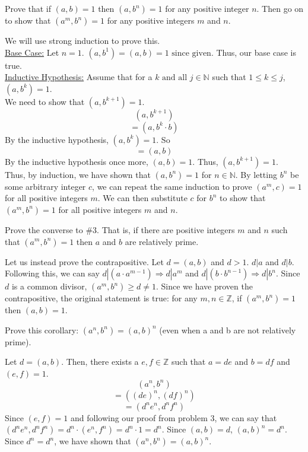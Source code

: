 \documentclass{article}
\begin{document}
\begin{problem}{}{}
    Prove that if $(a, b) = 1$ then $(a, b^n) = 1$ for any positive integer $n$. Then go on to show that $(a^m, b^n) = 1$ for any positive integers $m$ and $n$.
\end{problem}
\begin{solution}{}{}
    We will use strong induction to prove this.\\
    \underline{Base Case:} Let $n=1$. $(a,b^1)=(a,b)=1 \text{ since given.}$ Thus, our base case is true.\\
    \underline{Inductive Hypothesis:} Assume that for a $k \text{ and all } j\in\mathbb{N}$ such that $1\leq k\leq j$, $(a, b^k) = 1$. \\
    We need to show that $(a, b^{k+1}) = 1$. 
    \[(a, b^{k+1})\]
    \[=(a, b^k\cdot b)\]
    By the inductive hypothesis, $(a, b^k) = 1$. So
    \[=(a, b)\]
    By the inductive hypothesis once more, $(a,b)=1$. Thus, $(a, b^{k+1}) = 1$.\\
    Thus, by induction, we have shown that $(a, b^n) = 1$ for $n\in\mathbb{N}$. By letting $b^n$ be some arbitrary integer $c$, we can repeat the same induction to prove $(a^m,c)=1$ for all positive integers $m$. We can then substitute $c$ for $b^n$ to show that $(a^m, b^n) = 1$ for all positive integers $m$ and $n$.
\end{solution}

\begin{problem}{}{}
    Prove the converse to \#3. That is, if there are positive integers $m$ and $n$ such that $(a^m, b^n) = 1$ then $a$ and $b$ are relatively prime.    
\end{problem}
\begin{solution}{}{}
    Let us instead prove the contrapositive. Let $d=(a,b)$ and $d>1$. $d|a$ and $d|b$. Following this, we can say $d|(a\cdot a^{m-1})\Rightarrow d|a^m$ and $d|(b\cdot b^{n-1})\Rightarrow d|b^n$. Since $d$ is a common divisor, $(a^m,b^n)\geq d\neq 1$. Since we have proven the contrapositive, the original statement is true: for any $m,n\in\mathbb{Z}$, if $(a^m,b^n)=1$ then $(a,b)=1$.
\end{solution}

\begin{problem}{}{}
    Prove this corollary: $(a^n, b^n) = (a, b)^n$ (even when a and b are not relatively prime).
\end{problem}
\begin{solution}{}{}
    Let $d=(a,b)$. Then, there exists a $e,f\in\mathbb{Z}$ such that $a=de$ and $b=df$ and $(e,f)=1$.
    \[(a^n, b^n)\]
    \[=((de)^n,(df)^n)\]
    \[=(d^ne^n,d^nf^n)\]
    Since $(e,f)=1$ and following our proof from problem 3, we can say that $(d^ne^n,d^nf^n) = d^n\cdot(e^n,f^n)=d^n\cdot 1=d^n$.
    Since $(a,b)=d$, $(a,b)^n=d^n$. Since $d^n=d^n$, we have shown that $(a^n, b^n) = (a, b)^n$.
\end{solution}
\end{document}
